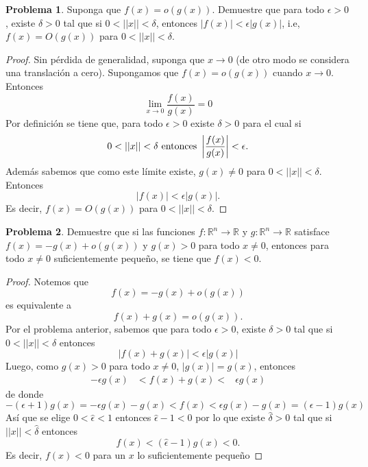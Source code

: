 \documentclass[12pt,letterpaper]{article}
\theoremstyle{definition}
\newtheorem{problm}{Problema}
\begin{document}
\begin{problm}
	Suponga que $ f(x) = o (g(x)) $. Demuestre que para todo $ \epsilon > 0 $, existe $ \delta > 0 $ tal que si $ 0 < || x || < \delta $, entonces $ |f(x)| < \epsilon |g(x)| $, i.e, $ f(x) = O(g(x)) $ para $ 0 < || x || < \delta $.
	\\
	\begin{proof}
		Sin pérdida de generalidad, suponga que $ x \to 0 $ (de otro modo se considera una translación a cero). Supongamos que $ f(x) = o(g(x)) $ cuando $ x \to 0 $. Entonces
		\[ \lim_{x \to 0} \dfrac{f(x)}{g(x)} = 0 \]
		Por definición se tiene que, para todo $ \epsilon > 0 $ existe $ \delta > 0 $ para el cual si
		\[0 <||x|| < \delta \textup{ entonces } \left|\dfrac{f(x)}{g(x)}\right| < \epsilon.\]
		Además sabemos que como este límite existe, $ g(x) \neq 0 $ para $ 0 < || x || < \delta $. Entonces
		\[ |f(x)| < \epsilon |g(x)|. \]
		Es decir, $ f(x) = O(g(x)) $ para $ 0 < || x || < \delta $.
	\end{proof}
\end{problm}

\begin{problm}
	Demuestre que si las funciones $ f: \mathbb{R}^n \to \mathbb{R} $ y $ g : \mathbb{R}^n \to \mathbb{R} $ satisface $ f(x) = -g(x) + o(g(x)) $ y $ g(x) > 0 $ para todo $ x \neq 0 $, entonces para todo $ x \neq 0 $ suficientemente pequeño, se tiene que $ f(x) < 0 $.
	\begin{proof}
		Notemos que 
		\[ f(x) = -g(x) + o(g(x)) \]
		es equivalente a
		\[ f(x) + g(x) = o(g(x)). \]
		Por el problema anterior, sabemos que para todo $ \epsilon > 0 $, existe $ \delta > 0 $ tal que si $ 0 < || x || < \delta $ entonces 
		\[| f(x) + g(x) | < \epsilon | g(x) |\]
		Luego, como $ g(x) > 0 $ para todo $ x \neq 0 $, $ | g(x) | = g(x) $, entonces
		\begin{eqnarray}
			-\epsilon g(x) & <  f(x) + g(x) < & \epsilon g(x)
		\end{eqnarray}
		de donde
		\[ -(\epsilon+1) g(x) = -\epsilon g(x) - g(x) < f(x) < \epsilon g(x) - g(x) = (\epsilon - 1) g(x) \]
		Así que se elige $ 0 < \hat{\epsilon} < 1 $ entonces $ \hat{\epsilon} - 1 < 0 $ por lo que existe $ \hat{\delta} > 0 $ tal que si $ ||x|| < \hat{\delta} $ entonces
		\[ f(x) < (\hat{\epsilon} - 1) g(x) < 0. \]
		Es decir, $ f(x) < 0 $ para un $ x $ lo suficientemente pequeño
	\end{proof}
\end{problm}
\end{document}

